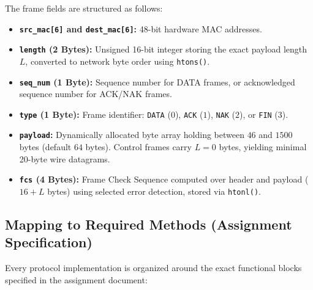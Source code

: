 \documentclass[11pt,a4paper]{article}
\begin{document}
The frame fields are structured as follows:
\begin{itemize}
    \item \textbf{\texttt{src\_mac[6]} and \texttt{dest\_mac[6]}:} 48-bit hardware MAC addresses.
    \item \textbf{\texttt{length} (2 Bytes):} Unsigned 16-bit integer storing the exact payload length $L$, converted to network byte order using \texttt{htons()}.
    \item \textbf{\texttt{seq\_num} (1 Byte):} Sequence number for DATA frames, or acknowledged sequence number for ACK/NAK frames.
    \item \textbf{\texttt{type} (1 Byte):} Frame identifier: \texttt{DATA} ($0$), \texttt{ACK} ($1$), \texttt{NAK} ($2$), or \texttt{FIN} ($3$).
    \item \textbf{\texttt{payload}:} Dynamically allocated byte array holding between $46$ and $1500$ bytes (default $64$ bytes). Control frames carry $L = 0$ bytes, yielding minimal 20-byte wire datagrams.
    \item \textbf{\texttt{fcs} (4 Bytes):} Frame Check Sequence computed over header and payload ($16 + L$ bytes) using selected error detection, stored via \texttt{htonl()}.
\end{itemize}

\subsection{Mapping to Required Methods (Assignment Specification)}
Every protocol implementation is organized around the exact functional blocks specified in the assignment document:
\end{document}
